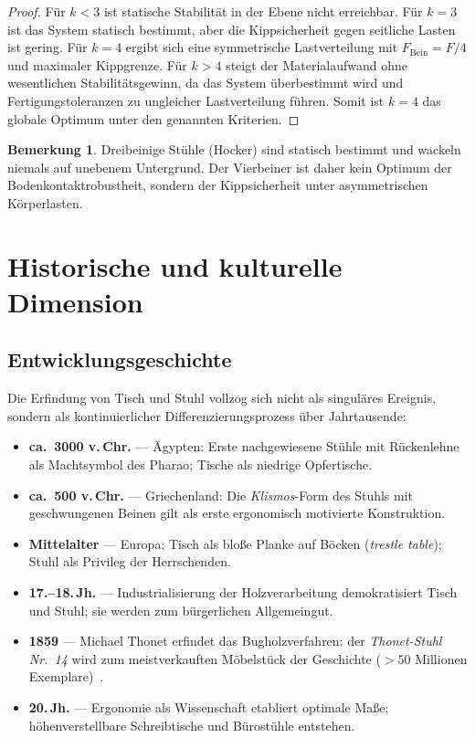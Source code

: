 ﻿\documentclass[a4paper,12pt]{article}
\theoremstyle{definition}
\newtheorem{bemerkung}{Bemerkung}
\begin{document}
\begin{proof}
	F\"{u}r $k < 3$ ist statische Stabilit\"{a}t in der Ebene nicht erreichbar. F\"{u}r $k = 3$
	ist das System statisch bestimmt, aber die Kippsicherheit gegen seitliche Lasten ist
	gering. F\"{u}r $k = 4$ ergibt sich eine symmetrische Lastverteilung mit
	$F_{\mathrm{Bein}} = F/4$ und maximaler Kippgrenze. F\"{u}r $k > 4$ steigt der
	Materialaufwand ohne wesentlichen Stabilit\"{a}tsgewinn, da das System \"{u}berbestimmt wird
	und Fertigungstoleranzen zu ungleicher Lastverteilung f\"{u}hren. Somit ist $k = 4$ das
	globale Optimum unter den genannten Kriterien.
\end{proof}

\begin{bemerkung}
	Dreibeinige St\"{u}hle (Hocker) sind statisch bestimmt und wackeln niemals auf unebenem
	Untergrund. Der Vierbeiner ist daher kein Optimum der Bodenkontaktrobustheit, sondern
	der Kippsicherheit unter asymmetrischen K\"{o}rperlasten.
\end{bemerkung}

\section{Historische und kulturelle Dimension}

\subsection{Entwicklungsgeschichte}

Die Erfindung von Tisch und Stuhl vollzog sich nicht als singul\"{a}res Ereignis, sondern
als kontinuierlicher Differenzierungsprozess \"{u}ber Jahrtausende:
\begin{itemize}
	\item \textbf{ca.\ 3000 v.\,Chr.} --- \"{A}gypten: Erste nachgewiesene St\"{u}hle mit
	      R\"{u}ckenlehne als Machtsymbol des Pharao; Tische als niedrige Opfertische.
	\item \textbf{ca.\ 500 v.\,Chr.} --- Griechenland: Die \emph{Klismos}-Form des Stuhls
	      mit geschwungenen Beinen gilt als erste ergonomisch motivierte Konstruktion.
	\item \textbf{Mittelalter} --- Europa: Tisch als blo\ss{}e Planke auf B\"{o}cken
	      (\emph{trestle table}); Stuhl als Privileg der Herrschenden.
	\item \textbf{17.--18.\,Jh.} --- Industrialisierung der Holzverarbeitung demokratisiert
	      Tisch und Stuhl; sie werden zum b\"{u}rgerlichen Allgemeingut.
	\item \textbf{1859} --- Michael Thonet erfindet das Bugholzverfahren: der
	      \emph{Thonet-Stuhl Nr.~14} wird zum meistverkauften M\"{o}belst\"{u}ck der Geschichte
	      ($> 50$ Millionen Exemplare)~\cite{VegesackThonet1996}.
	\item \textbf{20.\,Jh.} --- Ergonomie als Wissenschaft etabliert optimale Ma\ss{}e;
	      h\"{o}henverstellbare Schreibtische und B\"{u}rost\"{u}hle entstehen.
\end{itemize}
\end{document}
